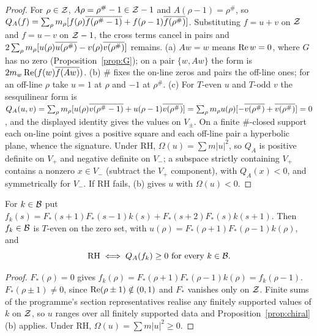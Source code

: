\begin{proof}
For $\rho\in\mathcal{Z}$, $A\rho=\rho^\#-1\in\mathcal{Z}-1$ and $A(\rho-1)=\rho^\#$, so $Q_A(f)=\sum_\rho m_\rho[f(\rho)\overline{f(\rho^\#-1)}+f(\rho-1)\overline{f(\rho^\#)}]$. Substituting $f=u+v$ on $\mathcal{Z}$ and $f=u-v$ on $\mathcal{Z}-1$, the cross terms cancel in pairs and $2\sum_\rho m_\rho[u(\rho)\overline{u(\rho^\#)}-v(\rho)\overline{v(\rho^\#)}]$ remains.
(a) $Aw=w$ means $\operatorname{Re} w=0$, where $G$ has no zero (Proposition~\ref{prop:G}); on a pair $\{w,Aw\}$ the form is $2m_w\operatorname{Re}(f(w)\overline{f(Aw)})$.
(b) $\#$ fixes the on-line zeros and pairs the off-line ones; for an off-line $\rho$ take $u=1$ at $\rho$ and $-1$ at $\rho^\#$.
(c) For $T$-even $u$ and $T$-odd $v$ the sesquilinear form is $Q_A(u,v)=\sum_\rho m_\rho[u(\rho)\overline{v(\rho^\#-1)}+u(\rho-1)\overline{v(\rho^\#)}]=\sum_\rho m_\rho u(\rho)[-\overline{v(\rho^\#)}+\overline{v(\rho^\#)}]=0$, and the displayed identity gives the values on $V_\pm$. On a finite $\#$-closed support each on-line point gives a positive square and each off-line pair a hyperbolic plane, whence the signature. Under RH, $\Omega(u)=\sum m|u|^2$, so $Q_A$ is positive definite on $V_+$ and negative definite on $V_-$; a subspace strictly containing $V_+$ contains a nonzero $x\in V_-$ (subtract the $V_+$ component), with $Q_A(x)<0$, and symmetrically for $V_-$. If RH fails, (b) gives $u$ with $\Omega(u)<0$.
\end{proof}

\begin{corollary}\label{cor:chiral}
For $k\in\mathcal{B}$ put $f_k(s)=F_*(s+1)F_*(s-1)k(s)+F_*(s+2)F_*(s)k(s+1)$. Then $f_k\in\mathcal{B}$ is $T$-even on the zero set, with $u(\rho)=F_*(\rho+1)F_*(\rho-1)k(\rho)$, and
\[
\text{RH}\iff Q_A(f_k)\ge0\ \text{for every }k\in\mathcal{B} .
\]
\end{corollary}

\begin{proof}
$F_*(\rho)=0$ gives $f_k(\rho)=F_*(\rho+1)F_*(\rho-1)k(\rho)=f_k(\rho-1)$. $F_*(\rho\pm1)\ne0$, since $\operatorname{Re}(\rho\pm1)\notin(0,1)$ and $F_*$ vanishes only on $\mathcal{Z}$. Finite sums of the programme's section representatives realise any finitely supported values of $k$ on $\mathcal{Z}$, so $u$ ranges over all finitely supported data and Proposition~\ref{prop:chiral}(b) applies. Under RH, $\Omega(u)=\sum m|u|^2\ge0$.
\end{proof}

